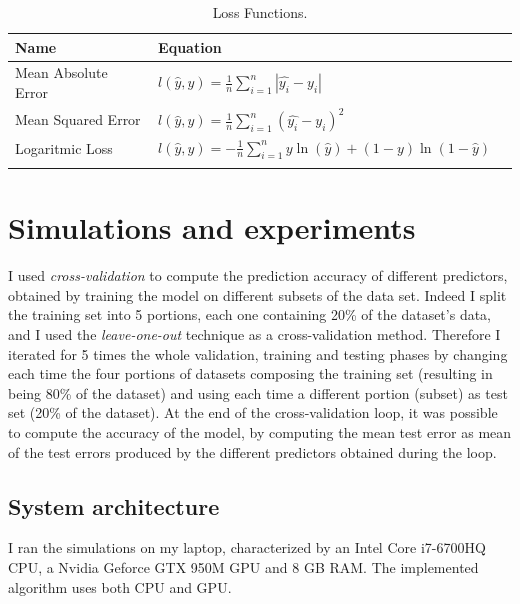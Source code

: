 \documentclass[10pt,journal,A4paper,compsoc,epsfig]{IEEEtran}
\begin{document}
\begin{table}
\centering
\begin{tabular}{l l l}
Name & Equation \\
\hline
\noalign{\medskip}
Mean Absolute Error & $l(\hat{y}, y) = \frac{1}{n}\sum\limits_{i=1}^n{|\hat{y_i}-y_i|}$ \\
\noalign{\smallskip}
Mean Squared Error & $l(\hat{y}, y) = \frac{1}{n}\sum\limits_{i=1}^n{(\hat{y_i}-y_i)^2}$ \\
\noalign{\smallskip}
Logaritmic Loss & $l(\hat{y}, y) = -\frac{1}{n}\sum\limits_{i=1}^n{y\ln(\hat{y}) + (1 - y)\ln(1 - \hat{y})}$ \\
\noalign{\smallskip}
\hline
\end{tabular}
\caption{Loss Functions.}
\label{table_loss}
\end{table}%


\section{Simulations and experiments}
\label{simul}

I used \textit{cross-validation} to compute the prediction accuracy of different predictors, obtained by training the model on different subsets of the data set. Indeed I split the training set into 5 portions, each one containing 20\% of the dataset's data, and I used the \textit{leave-one-out} technique as a cross-validation method. Therefore I iterated for 5 times the whole validation, training and testing phases by changing each time the four portions of datasets composing the training set (resulting in being 80\% of the dataset) and using each time a different portion (subset) as test set (20\% of the dataset).
At the end of the cross-validation loop, it was possible to compute the accuracy of the model, by computing the mean test error as mean of the test errors produced by the different predictors obtained during the loop.


\subsection{System architecture}
\label{arch}
I ran the simulations on my laptop, characterized by an Intel Core i7-6700HQ CPU, a Nvidia Geforce GTX 950M GPU and 8 GB RAM. The implemented algorithm uses both CPU and GPU.
\end{document}
